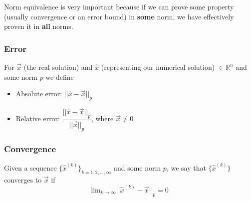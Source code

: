 \documentclass[12pt]{article}
\begin{document}
%

Norm equivalence is very important because if we can prove some property (usually convergence or an error bound) in \textbf{some} norm, we have effectively proven it in \textbf{all} norms. 

\subsubsection*{Error}
For $\vec{x}$ (the real solution) and $\hat{x}$ (representing our numerical solution) $\in \mathbb{R}^n$ and some norm $p$ we define
%
\begin{itemize}
\item Absolute error: $||\hat{x} - \vec{x}||_p$
\item Relative error: $\dfrac{||\hat{x} - \vec{x}||_p}{||\vec{x}||_p}$, where $\vec{x} \neq 0$
\end{itemize}

\subsubsection*{Convergence}
Given a sequence $\lbrace \hat{x}^{(k)} \rbrace_{k=1,2,\dots,\infty}$ and some norm $p$, we say that $\lbrace \hat{x}^{(k)} \rbrace$ converges to $\vec{x}$ if
%
\begin{equation}
\displaystyle\text{lim}_{k \rightarrow \infty} ||\hat{x}^{(k)} - \vec{x}||_p = 0 \nonumber
\end{equation}
\end{document}
